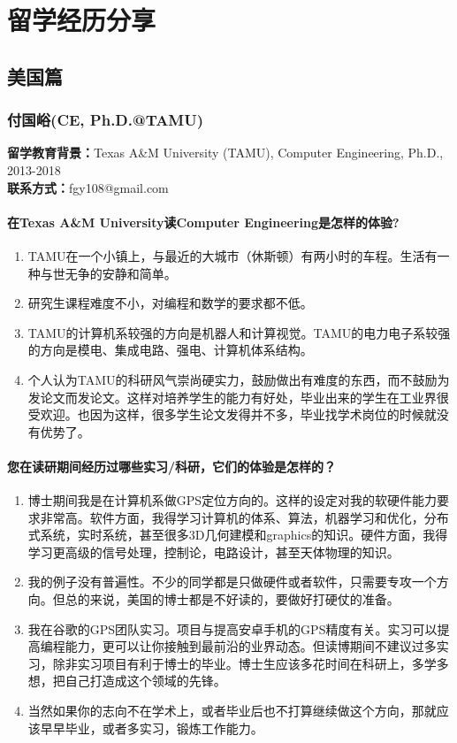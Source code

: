 \documentclass[a4paper,UTF8]{book}
\begin{document}
\clearpage

\chapter{留学经历分享}  %
\clearpage
\section{美国篇}
\subsection{付国峪(CE, Ph.D.@TAMU)}
    \textbf{留学教育背景：}Texas A\&M University (TAMU), Computer Engineering, Ph.D., 2013-2018\\
    \textbf{联系方式：}fgy108@gmail.com

    \subsubsection*{在Texas A\&M University读Computer Engineering是怎样的体验?}
        \begin{enumerate}[itemindent=0pt,itemsep=0pt,parsep=0pt]
            \item TAMU在一个小镇上，与最近的大城市（休斯顿）有两小时的车程。生活有一种与世无争的安静和简单。
            \item 研究生课程难度不小，对编程和数学的要求都不低。
            \item TAMU的计算机系较强的方向是机器人和计算视觉。TAMU的电力电子系较强的方向是模电、集成电路、强电、计算机体系结构。
            \item 个人认为TAMU的科研风气崇尚硬实力，鼓励做出有难度的东西，而不鼓励为发论文而发论文。这样对培养学生的能力有好处，毕业出来的学生在工业界很受欢迎。也因为这样，很多学生论文发得并不多，毕业找学术岗位的时候就没有优势了。
        \end{enumerate}
    \subsubsection*{您在读研期间经历过哪些实习/科研，它们的体验是怎样的？}
        \begin{enumerate}[itemindent=0pt,itemsep=0pt,parsep=0pt]
            \item 博士期间我是在计算机系做GPS定位方向的。这样的设定对我的软硬件能力要求非常高。软件方面，我得学习计算机的体系、算法，机器学习和优化，分布式系统，实时系统，甚至很多3D几何建模和graphics的知识。硬件方面，我得学习更高级的信号处理，控制论，电路设计，甚至天体物理的知识。
            \item 我的例子没有普遍性。不少的同学都是只做硬件或者软件，只需要专攻一个方向。但总的来说，美国的博士都是不好读的，要做好打硬仗的准备。
            \item 我在谷歌的GPS团队实习。项目与提高安卓手机的GPS精度有关。实习可以提高编程能力，更可以让你接触到最前沿的业界动态。但读博期间不建议过多实习，除非实习项目有利于博士的毕业。博士生应该多花时间在科研上，多学多想，把自己打造成这个领域的先锋。
            \item 当然如果你的志向不在学术上，或者毕业后也不打算继续做这个方向，那就应该早早毕业，或者多实习，锻炼工作能力。
        \end{enumerate}
\end{document}
